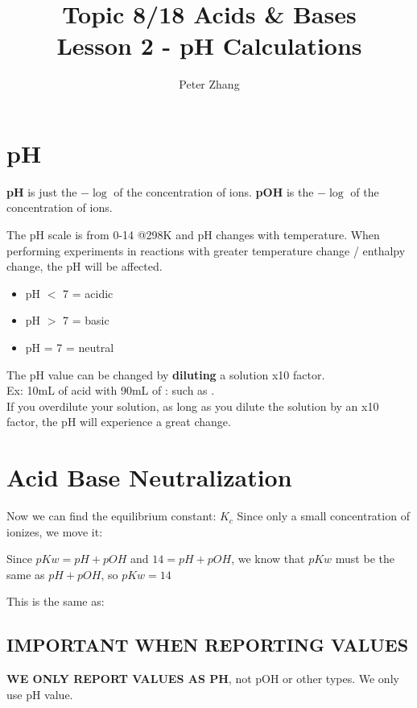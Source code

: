 \documentclass{article}
\title{Topic 8/18 Acids \& Bases\\Lesson 2 - pH Calculations}
\author{Peter Zhang}
\begin{document}
\maketitle
\tableofcontents
\newpage

\section{pH}
\textbf{pH} is just the $-\log $ of the concentration of  ions. \textbf{pOH} is the $-\log $ of the concentration of  ions.

The pH scale is from 0-14 @298K and pH changes with temperature. When performing experiments in reactions with greater temperature change / enthalpy change, the pH will be affected.
\begin{itemize}
\item pH $<$ 7 = acidic
\item pH $>$ 7 = basic
\item pH = 7 = neutral
\end{itemize}
The pH value can be changed by \textbf{diluting} a solution x10 factor. \\Ex: 10mL of acid with 90mL of : such as .\\If you overdilute your solution, as long as you dilute the solution by an x10 factor, the pH will experience a great change. 

\section{Acid Base Neutralization}

Now we can find the equilibrium constant: $K_{c}$
Since only a small concentration of  ionizes, we move it:

Since $pKw = pH + pOH$ and $14 = pH + pOH$, we know that $pKw$ must be the same as $pH + pOH$, so $pKw = 14$

This is the same as:

\subsection{IMPORTANT WHEN REPORTING VALUES}
\textbf{WE ONLY REPORT VALUES AS PH}, not pOH or other types. We only use pH value.
\end{document}
